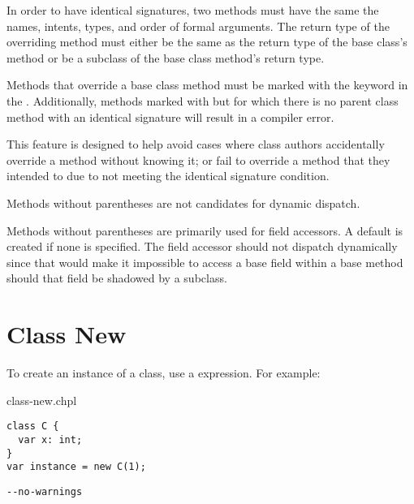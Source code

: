 In order to have identical signatures, two methods must have the same the
names, intents, types, and order of formal arguments. The return type of
the overriding method must either be the same as the return type of the base
class's method or be a subclass of the base class method's return
type.

Methods that override a base class method must be marked with the
 keyword in the . Additionally,
methods marked with  but for which there is no parent class
method with an identical signature will result in a compiler error.

\begin{rationale}
  This feature is designed to help avoid cases where class authors
  accidentally override a method without knowing it; or fail to override
  a method that they intended to due to not meeting the identical
  signature condition.
\end{rationale}


Methods without parentheses are not candidates for dynamic dispatch.
\begin{rationale}
Methods without parentheses are primarily used for field accessors.
A default is created if none is specified.  The field accessor
should not dispatch dynamically since that would make it
impossible to access a base field within a base method should that
field be shadowed by a subclass.
\end{rationale}

\section{Class New}
\label{Class_New}

To create an instance of a class, use a  expression. For
example:

\begin{chapelexample}{class-new.chpl}
\begin{chapel}
\begin{verbatim}
class C {
  var x: int;
}
var instance = new C(1);
\end{verbatim}
\end{chapel}
\begin{chapelcompopts}
\begin{verbatim}
--no-warnings
\end{verbatim}
\end{chapelcompopts}
\end{chapelexample}

